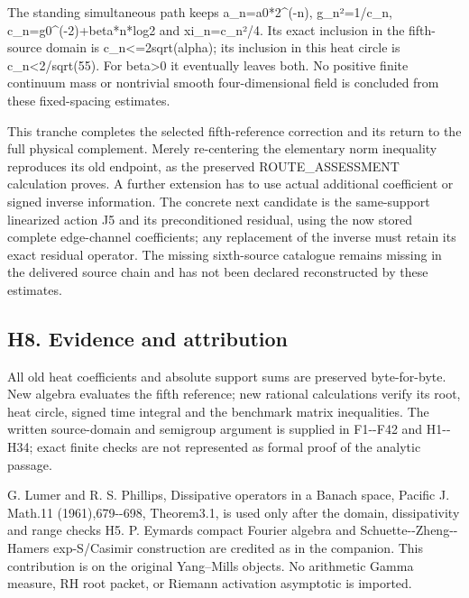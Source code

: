 \documentclass[11pt,a4paper]{article}
\begin{document}
The standing simultaneous path keeps a\_n=a0*2\^{}(-n), g\_n²=1/c\_n,
{c\allowbreak{}\_\allowbreak{}n\allowbreak{}=\allowbreak{}g\allowbreak{}0\allowbreak{}\textasciicircum{}\allowbreak{}(\allowbreak{}-\allowbreak{}2\allowbreak{})\allowbreak{}+\allowbreak{}b\allowbreak{}e\allowbreak{}t\allowbreak{}a\allowbreak{}*\allowbreak{}n\allowbreak{}*\allowbreak{}l\allowbreak{}o\allowbreak{}g\allowbreak{}2\allowbreak{}}
and xi\_n=c\_n²/4. Its exact inclusion in the fifth-source domain is
{c\allowbreak{}\_\allowbreak{}n\allowbreak{}\textless{}\allowbreak{}=\allowbreak{}2\allowbreak{}s\allowbreak{}q\allowbreak{}r\allowbreak{}t\allowbreak{}(\allowbreak{}a\allowbreak{}l\allowbreak{}p\allowbreak{}h\allowbreak{}a\allowbreak{})\allowbreak{};\allowbreak{}}
its inclusion in this heat circle is c\_n\textless2/sqrt(55). For
beta\textgreater0 it eventually leaves both. No positive finite
continuum mass or nontrivial smooth four-dimensional field is concluded
from these fixed-spacing estimates.

This tranche completes the selected fifth-reference correction and its
return to the full physical complement. Merely re-centering the
elementary norm inequality reproduces its old endpoint, as the preserved
ROUTE\_ASSESSMENT calculation proves. A further extension has to use
actual additional coefficient or signed inverse information. The
concrete next candidate is the same-support linearized action J5 and its
preconditioned residual, using the now stored complete edge-channel
coefficients; any replacement of the inverse must retain its exact
residual operator. The missing sixth-source catalogue remains missing in
the delivered source chain and has not been declared reconstructed by
these estimates.

\subsection{H8. Evidence and
attribution}\label{h8.-evidence-and-attribution}

All old heat coefficients and absolute support sums are preserved
byte-for-byte. New algebra evaluates the fifth reference; new rational
calculations verify its root, heat circle, signed time integral and the
benchmark matrix inequalities. The written source-domain and semigroup
argument is supplied in F1-\/-F42 and H1-\/-H34; exact finite checks are
not represented as formal proof of the analytic passage.

G. Lumer and R. S. Phillips, Dissipative operators in a Banach space,
Pacific J. Math.11 (1961),679-\/-698, Theorem3.1, is used only after the
domain, dissipativity and range checks H5. P. Eymard\textquotesingle s
compact Fourier algebra and Schuette-\/-Zheng-\/-Hamer\textquotesingle s
exp-S/Casimir construction are credited as in the companion. This
contribution is on the original Yang--Mills objects. No arithmetic Gamma
measure, RH root packet, or Riemann activation asymptotic is imported.
\end{document}

